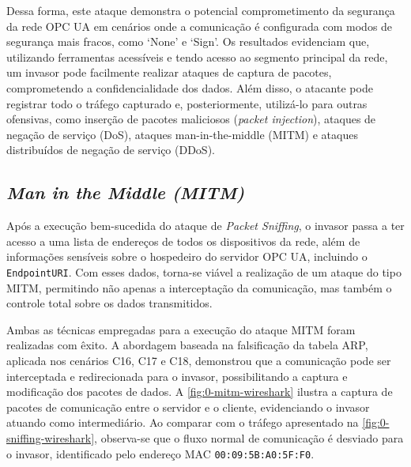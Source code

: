         Dessa forma, este ataque demonstra o potencial comprometimento da segurança da rede OPC UA em cenários onde a comunicação é configurada com modos de segurança mais fracos, como `None' e `Sign'. Os resultados evidenciam que, utilizando ferramentas acessíveis e tendo acesso ao segmento principal da rede, um invasor pode facilmente realizar ataques de captura de pacotes, comprometendo a confidencialidade dos dados. Além disso, o atacante pode registrar todo o tráfego capturado e, posteriormente, utilizá-lo para outras ofensivas, como inserção de pacotes maliciosos (\textit{packet injection}), ataques de negação de serviço (DoS), ataques man-in-the-middle (MITM) e ataques distribuídos de negação de serviço (DDoS).

    \subsection{\textit{Man in the Middle (MITM)}}

        Após a execução bem-sucedida do ataque de \textit{Packet Sniffing}, o invasor passa a ter acesso a uma lista de endereços de todos os dispositivos da rede, além de informações sensíveis sobre o hospedeiro do servidor OPC UA, incluindo o \texttt{EndpointURI}. Com esses dados, torna-se viável a realização de um ataque do tipo MITM, permitindo não apenas a interceptação da comunicação, mas também o controle total sobre os dados transmitidos.

        Ambas as técnicas empregadas para a execução do ataque MITM foram realizadas com êxito. A abordagem baseada na falsificação da tabela ARP, aplicada nos cenários C16, C17 e C18, demonstrou que a comunicação pode ser interceptada e redirecionada para o invasor, possibilitando a captura e modificação dos pacotes de dados. A \autoref{fig:0-mitm-wireshark} ilustra a captura de pacotes de comunicação entre o servidor e o cliente, evidenciando o invasor atuando como intermediário. Ao comparar com o tráfego apresentado na \autoref{fig:0-sniffing-wireshark}, observa-se que o fluxo normal de comunicação é desviado para o invasor, identificado pelo endereço MAC \texttt{00:09:5B:A0:5F:F0}.

